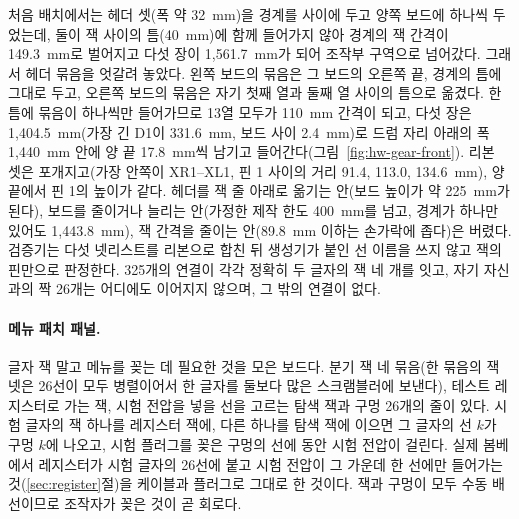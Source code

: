 처음 배치에서는 헤더 셋(폭 약 32~mm)을 경계를 사이에 두고 양쪽 보드에 하나씩 두었는데, 둘이 잭 사이의 틈(40~mm)에
함께 들어가지 않아 경계의 잭 간격이 149.3~mm로 벌어지고 다섯 장이 1,561.7~mm가 되어 조작부 구역으로 넘어갔다. 그래서
헤더 묶음을 엇갈려 놓았다. 왼쪽 보드의 묶음은 그 보드의 오른쪽 끝, 경계의 틈에 그대로 두고, 오른쪽 보드의 묶음은 자기
첫째 열과 둘째 열 사이의 틈으로 옮겼다. 한 틈에 묶음이 하나씩만 들어가므로 13열 모두가 110~mm 간격이 되고, 다섯 장은
1,404.5~mm(가장 긴 D1이 331.6~mm, 보드 사이 2.4~mm)로 드럼 자리 아래의 폭 1,440~mm 안에 양 끝 17.8~mm씩 남기고
들어간다(그림~\ref{fig:hw-gear-front}). 리본 셋은 포개지고(가장 안쪽이 XR1--XL1, 핀 1 사이의 거리 91.4, 113.0, 134.6~mm),
양 끝에서 핀 1의 높이가 같다. 헤더를 잭 줄 아래로 옮기는 안(보드 높이가 약 225~mm가 된다), 보드를 줄이거나 늘리는 안(가정한
제작 한도 400~mm를 넘고, 경계가 하나만 있어도 1,443.8~mm), 잭 간격을 줄이는 안(89.8~mm 이하는 손가락에 좁다)은 버렸다.
검증기는 다섯 넷리스트를 리본으로 합친 뒤 생성기가 붙인 선 이름을 쓰지 않고 잭의 핀만으로 판정한다. 325개의 연결이
각각 정확히 두 글자의 잭 네 개를 잇고, 자기 자신과의 짝 26개는 어디에도 이어지지 않으며, 그 밖의 연결이 없다.

\paragraph{메뉴 패치 패널.} 글자 잭 말고 메뉴를 꽂는 데 필요한 것을 모은 보드다. 분기 잭 네 묶음(한 묶음의 잭 넷은
26선이 모두 병렬이어서 한 글자를 둘보다 많은 스크램블러에 보낸다), 테스트 레지스터로 가는 잭, 시험 전압을 넣을 선을
고르는 탐색 잭과 구멍 26개의 줄이 있다. 시험 글자의 잭 하나를 레지스터 잭에, 다른 하나를 탐색 잭에 이으면 그 글자의
선 $k$가 구멍 $k$에 나오고, 시험 플러그를 꽂은 구멍의 선에  동안 시험 전압이 걸린다. 실제 봄베에서
레지스터가 시험 글자의 26선에 붙고 시험 전압이 그 가운데 한 선에만 들어가는 것(\ref{sec:register}절)을 케이블과 플러그로
그대로 한 것이다. 잭과 구멍이 모두 수동 배선이므로 조작자가 꽂은 것이 곧 회로다.

